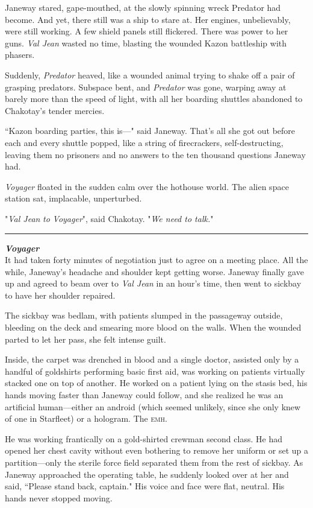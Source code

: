 \documentclass[twoside,letterpaper,12pt]{memoir}
\begin{document}
Janeway stared, gape-mouthed, at the slowly spinning wreck Predator had become. And yet, there still was a ship to stare at. Her engines, unbelievably, were still working. A few shield panels still flickered. There was power to her guns. \textit{Val Jean} wasted no time, blasting the wounded Kazon battleship with phasers.

Suddenly, \textit{Predator} heaved, like a wounded animal trying to shake off a pair of grasping predators. Subspace bent, and \textit{Predator} was gone, warping away at barely more than the speed of light, with all her boarding shuttles abandoned to Chakotay's tender mercies.

``Kazon boarding parties, this is---" said Janeway. That's all she got out before each and every shuttle popped, like a string of firecrackers, self-destructing, leaving them no prisoners and no answers to the ten thousand questions Janeway had.

\textit{Voyager} floated in the sudden calm over the hothouse world. The alien space station sat, implacable, unperturbed.

"\textit{Val Jean} \textit{to} \textit{Voyager}", said Chakotay. "\textit{We need to talk.}"

\fancybreak{\rule{3cm}{0.4 pt}}
\noindent\textit{\textbf{Voyager}}\\

It had taken forty minutes of negotiation just to agree on a meeting place. All the while, Janeway's headache and shoulder kept getting worse. Janeway finally gave up and agreed to beam over to \textit{Val Jean} in an hour's time, then went to sickbay to have her shoulder repaired.

The sickbay was bedlam, with patients slumped in the passageway outside, bleeding on the deck and smearing more blood on the walls. When the wounded parted to let her pass, she felt intense guilt.

Inside, the carpet was drenched in blood and a single doctor, assisted only by a handful of goldshirts performing basic first aid, was working on patients virtually stacked one on top of another. He worked on a patient lying on the stasis bed, his hands moving faster than Janeway could follow, and she realized he was an artificial human---either an android (which seemed unlikely, since she only knew of one in Starfleet) or a hologram. The \textsc{emh}.

He was working frantically on a gold-shirted crewman second class. He had opened her chest cavity without even bothering to remove her uniform or set up a partition---only the sterile force field separated them from the rest of sickbay. As Janeway approached the operating table, he suddenly looked over at her and said, ``Please stand back, captain." His voice and face were flat, neutral. His hands never stopped moving.
\end{document}
